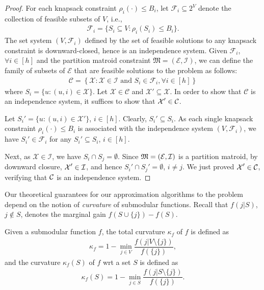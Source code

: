 \begin{proof}
 For each knapsack constraint $\rho_i(\cdot) \le B_i$, let $\mathcal{F}_i \subseteq 2^V$ denote the collection of feasible subsets of $V$, i.e.,
\begin{align*}
\mathcal{F}_i = \{ S_i \subseteq V : \rho_i(S_i) \le B_i \}.
\end{align*}
The set system $(V,\mathcal{F}_i)$ defined by the set of feasible solutions to any knapsack constraint is downward-closed, hence is an independence system. Given $\mathcal{F}_i$, $\forall i \in [h]$ and the partition matroid constraint $\mathfrak{M} = (\mathcal{E}, \mathcal{I})$, we can define the family of subsets of $\mathcal{E}$ that are feasible solutions to the \RM problem as follows:
\begin{align*}
\mathcal{C} = \left\{ \mathcal{X} : \mathcal{X} \in \mathcal{I} \text{ and } S_i \in \mathcal{F}_i, \forall i \in [h]  \right\}
\end{align*}
where $S_i = \{ u : (u,i) \in \mathcal{X} \}$. Let $\mathcal{X} \in \mathcal{C}$ and $\mathcal{X}' \subseteq \mathcal{X}$. In order to show that $\mathcal{C}$ is an independence system, it suffices to show that $\mbox{$\mathcal{X}$}'\in \mbox{$\mathcal{C}$}$.

Let $S_i' = \{ u : (u, i) \in \mathcal{X}' \} $, $i  \in [h]$.
Clearly, $S_i' \subseteq S_i$. As each single knapsack constraint $\rho_i(\cdot) \le B_i$ is associated with the independence system $(V, \mathcal{F}_i)$, we have $S_i' \in \mathcal{F}_i$ for any $S_i' \subseteq S_i$, $i \in [h]$.

Next, as $\mathcal{X} \in \mathcal{I}$, we have $S_i \cap S_j = \emptyset$.
Since $\mathfrak{M} = (\mbox{$\mathcal{E}$}, \mbox{$\mathcal{I}$})$ is a partition matroid, by downward closure, $\mbox{$\mathcal{X}$}' \in \mbox{$\mathcal{I}$}$, and hence $S_i'\cap S_j' = \emptyset$, $i \ne j$.
We just proved $\mbox{$\mathcal{X}$}' \in \mbox{$\mathcal{C}$}$, verifying that $\mbox{$\mathcal{C}$}$ is an independence system.

\end{proof}
Our theoretical guarantees for our approximation algorithms to the \RM problem depend on the notion of \emph{curvature} of submodular functions. Recall that $f(j|S)$, $j\not\in S$, denotes the marginal gain $f(S\cup\{j\}) - f(S)$.
\begin{definition}[Curvature]\cite{conforti1984submodular}
Given a submodular function $f$, the total curvature $\kappa_f$ of $f$ is defined as
\begin{align*}
\kappa_f = 1 - \underset{j \in V} {\min} \dfrac{f(j|V\setminus\{j\})}{f(\{j\})},
\end{align*}
and the curvature $\kappa_f(S)$ of $f$ wrt a set $S$ is defined as
\begin{align*}
\kappa_f(S) = 1 - \underset{j \in S} {\min} \dfrac{f(j|S\setminus\{j\})}{f(\{j\})}.
\end{align*}
\end{definition}
